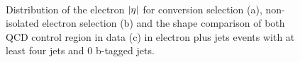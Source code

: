 \begin{figure}[htbp]
	\centering
  	\hfill
	 \\
    \caption{Distribution of the electron $\lvert \eta \rvert$ for conversion selection (a), non-isolated electron selection
    (b) and the shape comparison of both QCD control region in data (c) in electron plus jets events with at least
    four jets and 0 b-tagged jets.}
    \label{fig:qcd_control_regions_eta}
\end{figure}

